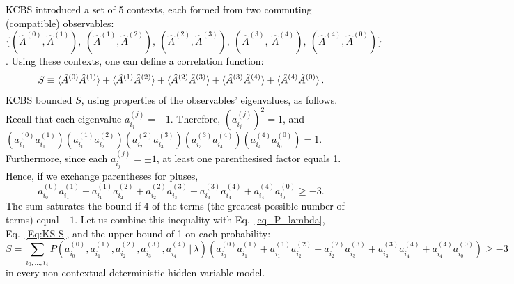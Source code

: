 \documentclass[%
 reprint,
superscriptaddress,
nofootinbib,
bibnotes,
 amsmath,amssymb,
 aps,
]{revtex4-1}
\theoremstyle{plain}
\newcommand{\nicole}[1]{\textcolor{black}{#1} }
\begin{document}
\nicole{
KCBS introduced a set of 5 contexts, each formed from two commuting (compatible) observables:
$\{ ( \hat{A}^{(0)} , \hat{A}^{(1)} ) , \:  ( \hat{A}^{(1)} , \hat{A}^{(2)} ) , \:  ( \hat{A}^{(2)} , \hat{A}^{(3)} ) , \:  ( \hat{A}^{(3)} , \: \hat{A}^{(4)} ) , \:  ( \hat{A}^{(4)} , \hat{A}^{(0)} )  \}$.  
Using these contexts, one can define a correlation function:
\begin{equation}
\label{Eq:KS-S}
S \equiv \braket{\hat{A}^{(0)}  \hat{A}^{(1)}} + \braket{\hat{A}^{(1)}  \hat{A}^{(2)}} + \braket{\hat{A}^{(2)}  \hat{A}^{(3)}} + \braket{\hat{A}^{(3)}  \hat{A}^{(4)}} + \braket{\hat{A}^{(4)}  \hat{A}^{(0)}} .
\end{equation}
KCBS bounded $S$, using properties of the observables' eigenvalues, as follows. 
Recall that each eigenvalue $a^{(j)}_{i_j} = \pm 1$. Therefore,
$( a^{(j)}_{i_j} )^2 = 1$, and
$\left(  a^{(0)}_{i_0} a^{(1)}_{i_1}  \right)
   \left( a^{(1)}_{i_1} a^{(2)}_{i_2} \right)
   \left( a^{(2)}_{i_2} a^{(3)}_{i_3} \right)
   \left( a^{(3)}_{i_3} a^{(4)}_{i_4} \right)
   \left( a^{(4)}_{i_4} a^{(0)}_{i_0} \right)
   =  1 .$ ~\cite{Klyachko08}
Furthermore, since each $a^{(j)}_{i_j} = \pm 1$, at least one parenthesised factor equals 1. Hence, if we exchange parentheses for pluses,
\begin{equation}
a^{(0)}_{i_0} a^{(1)}_{i_1} + a^{(1)}_{i_1} a^{(2)}_{i_2} + a^{(2)}_{i_2} a^{(3)}_{i_3} + a^{(3)}_{i_3} a^{(4)}_{i_4} + a^{(4)}_{i_4} a^{(0)}_{i_0} \geq -3 .
\end{equation}
The sum saturates the bound if 4 of the terms (the greatest possible number of terms) equal $-1$.
Let us combine this inequality with Eq.~\eqref{eq_P_lambda}, Eq.~\eqref{Eq:KS-S}, and the upper bound of 1 on each probability:
\begin{equation}
   \label{eq_S_bound}
S = \sum_{i_0, \ldots, i_4} P(a^{(0)}_{i_0}, a^{(1)}_{i_1}, a^{(2)}_{i_2},a^{(3)}_{i_3} ,a^{(4)}_{i_4} \, | \, \lambda) \left( a^{(0)}_{i_0} a^{(1)}_{i_1} + a^{(1)}_{i_1} a^{(2)}_{i_2} + a^{(2)}_{i_2} a^{(3)}_{i_3} + a^{(3)}_{i_3} a^{(4)}_{i_4} + a^{(4)}_{i_4} a^{(0)}_{i_0} \right) \geq -3 
\end{equation}
in every non-contextual deterministic hidden-variable model.
}
\end{document}
